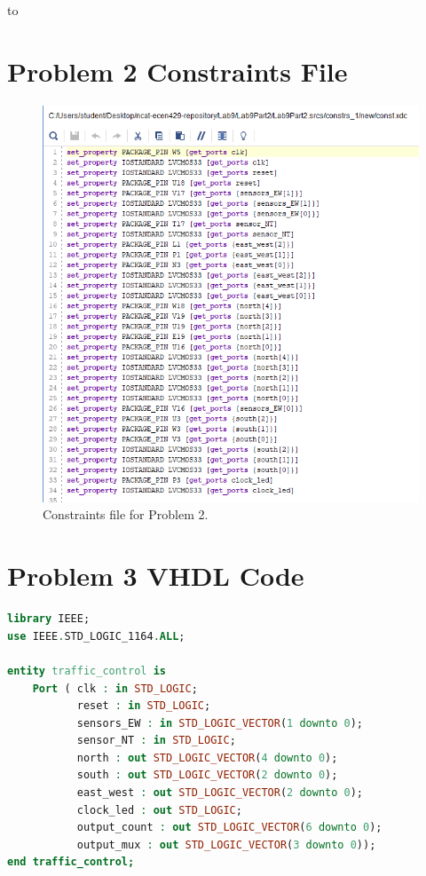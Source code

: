 to\documentclass[11pt]{article}
\begin{document}
\begin{appendices}
\section{Problem 2 Constraints File}
\begin{center}
\begin{figure}[H]
	\includegraphics[scale=1]{./images/Part2/l9p2const.png}
	\caption{\label{fig:Prob2Const}Constraints file for Problem 2.}
\end{figure}
\end{center}

\section{Problem 3 VHDL Code}
\begin{lstlisting}[language=VHDL]
library IEEE;
use IEEE.STD_LOGIC_1164.ALL;

entity traffic_control is
    Port ( clk : in STD_LOGIC;
           reset : in STD_LOGIC;
           sensors_EW : in STD_LOGIC_VECTOR(1 downto 0);
           sensor_NT : in STD_LOGIC;
           north : out STD_LOGIC_VECTOR(4 downto 0);
           south : out STD_LOGIC_VECTOR(2 downto 0);
           east_west : out STD_LOGIC_VECTOR(2 downto 0);
           clock_led : out STD_LOGIC;
           output_count : out STD_LOGIC_VECTOR(6 downto 0);
           output_mux : out STD_LOGIC_VECTOR(3 downto 0));
end traffic_control;


\end{lstlisting}
\end{appendices}
\end{document}
